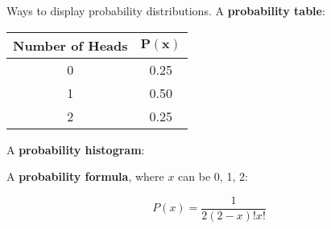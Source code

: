 \documentclass{beamer}
\newcommand{\prob}[1]{P\left(#1\right)}
\begin{document}
\begin{frame}
\begin{block}{Ways to display probability distributions.}
A \textbf{probability table}:

\vspace{-3mm}
\begin{center}
\begin{tabular}{|c|c|}\hline
\textbf{Number of Heads} & $\boldsymbol{\prob{x}}$ \\\hline
0 & 0.25 \\
1 & 0.50 \\
2 & 0.25\\\hline
\end{tabular}
\end{center}\pause

A \textbf{probability histogram}:
\begin{center}
\end{center}\pause

A \textbf{probability formula}, where $x$ can be 0, 1, 2:

\vspace{-4mm}
\begin{equation*}
\prob{x}=\dfrac{1}{2(2-x)!x!}
\end{equation*}
\end{block}
\end{frame}
\end{document}
